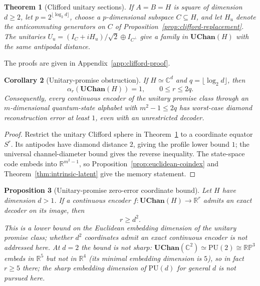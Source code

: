 \documentclass[11pt,a4paper]{article}
\theoremstyle{definition}
\theoremstyle{plain}
\newtheorem{theorem}{Theorem}[section]
\newtheorem{proposition}[theorem]{Proposition}
\newtheorem{corollary}[theorem]{Corollary}
\theoremstyle{remark}
\newcommand{\UChan}{\mathbf{UChan}}
\begin{document}
\begin{theorem}[Clifford unitary sections]
\label{thm:clifford-unitary}
If $A=B=H$ is square of dimension $d\geq2$, let $p=2^{\lfloor\log_2d\rfloor}$,
choose a $p$-dimensional subspace $C\subseteq H$, and let $H_u$ denote the
anticommuting generators on $C$ of Proposition~\ref{prop:clifford-replacement}.
The unitaries $U_u=(I_C+iH_u)/\sqrt2\oplus I_{C^\perp}$ give a family in
$\UChan(H)$ with the same antipodal distance.
\end{theorem}

The proofs are given in Appendix~\ref{app:clifford-proof}.


\begin{corollary}[Unitary-promise obstruction]
\label{cor:unitary-promise}
If $H\simeq\mathbb C^d$ and $q=\lfloor\log_2d\rfloor$, then
\[
\alpha_r(\UChan(H))=1,
\qquad0\leq r\leq2q.
\]
Consequently, every continuous encoder of the unitary promise class through
an $m$-dimensional quantum-state alphabet with $m^2-1\leq2q$ has worst-case
diamond reconstruction error at least $1$, even with an unrestricted
decoder.
\end{corollary}

\begin{proof}
Restrict the unitary Clifford sphere in Theorem~\ref{thm:clifford-unitary} to a
coordinate equator $S^r$. Its antipodes have diamond distance $2$, giving
the profile lower bound $1$; the universal channel-diameter bound gives the
reverse inequality. The state-space code embeds into
$\mathbb R^{m^2-1}$, so Proposition~\ref{prop:euclidean-coindex} and
Theorem~\ref{thm:intrinsic-latent} give the memory statement.
\end{proof}

\begin{proposition}[Unitary-promise zero-error coordinate bound]
\label{prop:unitary-coordinate-bound}
Let $H$ have dimension $d>1$. If a continuous encoder
$f:\UChan(H)\to\mathbb R^r$ admits an exact decoder on its image, then
\[
r\geq d^2.
\]
This is a lower bound on the Euclidean embedding dimension of the unitary promise class; whether $d^2$ coordinates admit an exact continuous encoder is not addressed here. At $d=2$ the bound is not sharp: $\UChan(\mathbb C^2)\simeq\mathrm{PU}(2)\cong\mathbb{RP}^3$ embeds in $\mathbb R^5$ but not in $\mathbb R^4$ (its minimal embedding dimension is $5$), so in fact $r\geq5$ there; the sharp embedding dimension of $\mathrm{PU}(d)$ for general $d$ is not pursued here.
\end{proposition}
\end{document}
